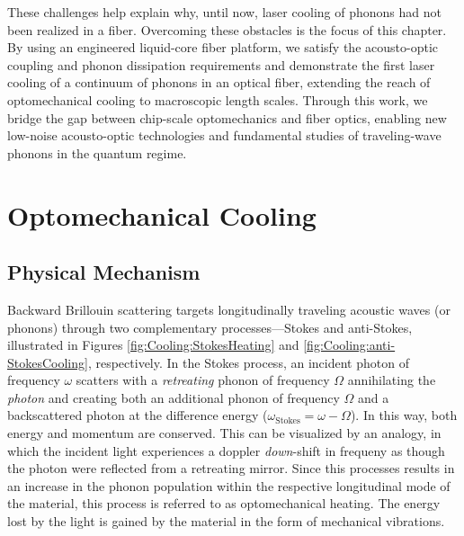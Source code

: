 These challenges help explain why, until now, laser cooling of phonons had not been realized in a fiber. Overcoming these obstacles is the focus of this chapter. By using an engineered liquid-core fiber platform, we satisfy the acousto-optic coupling and phonon dissipation requirements and demonstrate the first laser cooling of a continuum of phonons in an optical fiber, extending the reach of optomechanical cooling to macroscopic length scales. Through this work, we bridge the gap between chip-scale optomechanics and fiber optics, enabling new low-noise acousto-optic technologies and fundamental studies of traveling-wave phonons in the quantum regime.


\section{Optomechanical Cooling}
\label{Cooling:sec:Optomechanical Cooling}

\subsection{Physical Mechanism}
\label{Cooling:subsec:PhysicalMechanism}

Backward Brillouin scattering targets longitudinally traveling acoustic waves (or phonons) through two complementary processes---Stokes and anti-Stokes, illustrated in Figures \ref{fig:Cooling:StokesHeating} and \ref{fig:Cooling:anti-StokesCooling}, respectively. In the Stokes process, an incident photon of frequency \(\omega\) scatters with a \textit{retreating} phonon of frequency \(\Omega\) annihilating the \textit{photon} and creating both an additional phonon of frequency \(\Omega\) and a backscattered photon at the difference energy (\(\omega_{\mathrm{Stokes}} = \omega - \Omega\)). In this way, both energy and momentum are conserved. This can be visualized by an analogy, in which the incident light experiences a doppler \textit{down}-shift in frequeny as though the photon were reflected from a retreating mirror. Since this processes results in an increase in the phonon population within the respective longitudinal mode of the material, this process is referred to as optomechanical heating. The energy lost by the light is gained by the material in the form of mechanical vibrations.

